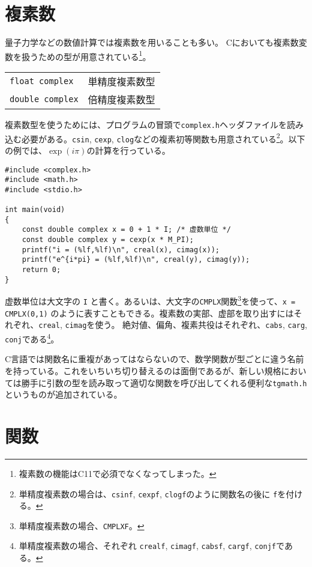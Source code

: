 \section{複素数}
\label{sec:C:complex}
量子力学などの数値計算では複素数を用いることも多い。
Cにおいても複素数変数を扱うための型が用意されている\footnote{複素数の機能はC11で必須でなくなってしまった。}。
\begin{table}[H]
    \centering
    \begin{tabular}{ll}
        \texttt{float complex}  & 単精度複素数型 \\
        \texttt{double complex} & 倍精度複素数型
    \end{tabular}
\end{table} \noindent
複素数型を使うためには、プログラムの冒頭で\texttt{complex.h}ヘッダファイルを読み込む必要がある。\texttt{csin}, \texttt{cexp}, \texttt{clog}などの複素初等関数も用意されている\footnote{単精度複素数の場合は、\texttt{csinf}, \texttt{cexpf}, \texttt{clogf}のように関数名の後に \texttt{f}を付ける。}。以下の例では、\(\exp(i\pi)\)の計算を行っている。
\begin{reidai}\label{ex:complex}
    \begin{verbatim}
#include <complex.h>
#include <math.h>
#include <stdio.h>

int main(void)
{
    const double complex x = 0 + 1 * I; /* 虚数単位 */
    const double complex y = cexp(x * M_PI);
    printf("i = (%lf,%lf)\n", creal(x), cimag(x));
    printf("e^{i*pi} = (%lf,%lf)\n", creal(y), cimag(y));
    return 0;
}
\end{verbatim}
\end{reidai} \noindent
虚数単位は大文字の \texttt{I} と書く。あるいは、大文字の\texttt{CMPLX}関数\footnote{単精度複素数の場合、\texttt{CMPLXF}。}を使って、\texttt{x = CMPLX(0,1)} のように表すこともできる。複素数の実部、虚部を取り出すにはそれぞれ、\texttt{creal}, \texttt{cimag}を使う。
絶対値、偏角、複素共役はそれぞれ、\texttt{cabs}, \texttt{carg}, \texttt{conj}である\footnote{単精度複素数の場合、それぞれ \texttt{crealf}, \texttt{cimagf}, \texttt{cabsf}, \texttt{cargf}, \texttt{conjf}である。}。

C言語では関数名に重複があってはならないので、数学関数が型ごとに違う名前を持っている。これをいちいち切り替えるのは面倒であるが、新しい規格においては勝手に引数の型を読み取って適切な関数を呼び出してくれる便利な\texttt{tgmath.h}というものが追加されている。

\section{関数}
\label{sec:C:function}

